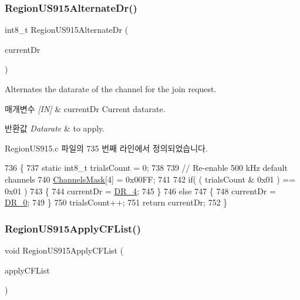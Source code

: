 \subsubsection{\texorpdfstring{Region\+U\+S915\+Alternate\+Dr()}{RegionUS915AlternateDr()}}
{\footnotesize\ttfamily int8\+\_\+t Region\+U\+S915\+Alternate\+Dr (\begin{DoxyParamCaption}\item[{int8\+\_\+t}]{current\+Dr }\end{DoxyParamCaption})}



Alternates the datarate of the channel for the join request. 


\begin{DoxyParams}{매개변수}
{\em \mbox{[}\+I\+N\mbox{]}} & current\+Dr Current datarate.\\
\hline
\end{DoxyParams}

\begin{DoxyRetVals}{반환값}
{\em Datarate} & to apply. \\
\hline
\end{DoxyRetVals}


Region\+U\+S915.\+c 파일의 735 번째 라인에서 정의되었습니다.


\begin{DoxyCode}
736 \{
737     \textcolor{keyword}{static} int8\_t trialsCount = 0;
738 
739     \textcolor{comment}{// Re-enable 500 kHz default channels}
740     \mbox{\hyperlink{_region_u_s915_8c_a2188957b5ca6af8092154d7ccbfa5757}{ChannelsMask}}[4] = 0x00FF;
741 
742     \textcolor{keywordflow}{if}( ( trialsCount & 0x01 ) == 0x01 )
743     \{
744         currentDr = \mbox{\hyperlink{group___r_e_g_i_o_n_ga6ceba6158a7dab238e9d0b846fb47a0c}{DR\_4}};
745     \}
746     \textcolor{keywordflow}{else}
747     \{
748         currentDr = \mbox{\hyperlink{group___r_e_g_i_o_n_ga6c4ef966b4f3d5eb7597b087f2b97095}{DR\_0}};
749     \}
750     trialsCount++;
751     \textcolor{keywordflow}{return} currentDr;
752 \}
\end{DoxyCode}
\mbox{\label{group___r_e_g_i_o_n_u_s915_ga072949ee3a416e1bfbe2b3a2c478b13b}} 
\subsubsection{\texorpdfstring{Region\+U\+S915\+Apply\+C\+F\+List()}{RegionUS915ApplyCFList()}}
{\footnotesize\ttfamily void Region\+U\+S915\+Apply\+C\+F\+List (\begin{DoxyParamCaption}\item[{\mbox{\hyperlink{group___r_e_g_i_o_n_ga71588e9ad07e34b78fa91d51881fd3c6}{Apply\+C\+F\+List\+Params\+\_\+t}} $\ast$}]{apply\+C\+F\+List }\end{DoxyParamCaption})}



